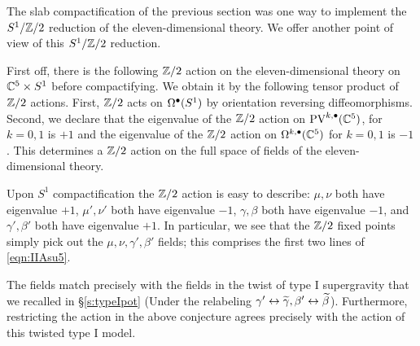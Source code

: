 %
%
%
%

\parsec[]\label{s:orbifold}

The slab compactification of the previous section was one way to implement the $S^1 / \mathbb Z/2$ reduction of the eleven-dimensional theory. 
We offer another point of view of this $S^1 / \mathbb Z/2$ reduction. 

First off, there is the following $\mathbb Z/2$ action on the eleven-dimensional theory on $\mathbb C^5 \times S^1$ before compactifying. 
We obtain it by the following tensor product of $\mathbb Z/2$ actions. 
First, $\mathbb Z/2$ acts on $\Omega^\bullet(S^1)$ by orientation reversing diffeomorphisms. 
Second, we declare that the eigenvalue of the $\mathbb Z/2$ action on ${\rm PV}^{k,\bullet}(\mathbb C^5)$, for $k=0,1$ is $+1$ and the eigenvalue of the $\mathbb Z/2$ action on $\Omega^{k,\bullet}(\mathbb C^5)$ for $k=0,1$ is $-1$. 
This determines a $\mathbb Z/2$ action on the full space of fields of the eleven-dimensional theory. 

Upon $S^1$ compactification the $\mathbb Z/2$ action is easy to describe: $\mu,\nu$ both have eigenvalue $+1$, $\mu',\nu'$ both have eigenvalue $-1$, $\gamma,\beta$ both have eigenvalue $-1$, and $\gamma',\beta'$ both have eigenvalue $+1$. 
In particular, we see that the $\mathbb Z/2$ fixed points simply pick out the $\mu, \nu, \gamma', \beta'$ fields; this comprises the first two lines of \eqref{eqn:IIAsu5}. 

The fields match precisely with the fields in the twist of type I supergravity that we recalled in \S \ref{s:typeIpot} (Under the relabeling $\gamma' \leftrightarrow \widetilde \gamma, \beta' \leftrightarrow \widetilde \beta$). 
Furthermore, restricting the action in the above conjecture agrees precisely with the action of this twisted type I model. 

